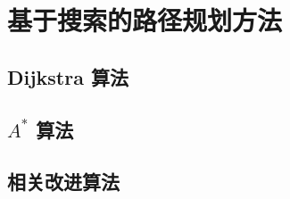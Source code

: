 \documentclass{standalone}
\begin{document}
\chapter{基于搜索的路径规划方法}
\section{Dijkstra 算法}
\section{$A^{*}$ 算法}
\section{相关改进算法}
\end{document}
